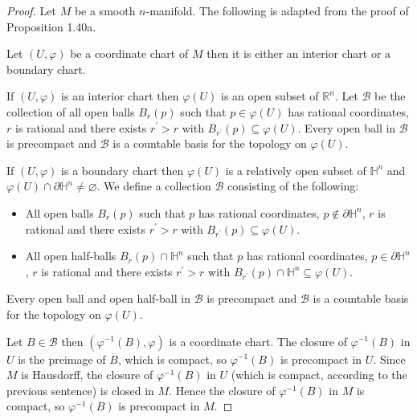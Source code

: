 \begin{proof}
    Let \( M \) be a smooth \(n\)-manifold. The following is adapted from the proof of Proposition 1.40a.

    Let \( (U, \varphi) \) be a coordinate chart of \( M \) then it is either an interior chart or a boundary chart.

    If \( (U, \varphi) \) is an interior chart then \( \varphi(U) \) is an open subset of \( \mathbb{R}^{n} \). Let \( \mathcal{B} \) be the collection of all open balls \( B_{r}(p) \) such that \( p \in \varphi(U) \) has rational coordinates, \( r \) is rational and there exists \( r^{\prime} > r \) with \( B_{r^{\prime}}(p) \subseteq \varphi(U) \). Every open ball in \( \mathcal{B} \) is precompact and \( \mathcal{B} \) is a countable basis for the topology on \( \varphi(U) \).

    If \( (U, \varphi) \) is a boundary chart then \( \varphi(U) \) is a relatively open subset of \( \mathbb{H}^{n} \) and \( \varphi(U) \cap \partial \mathbb{H}^{n} \ne \varnothing \). We define a collection \( \mathcal{B} \) consisting of the following:
    \begin{itemize}[itemsep=0pt]
        \item All open balls \( B_{r}(p) \) such that \( p \) has rational coordinates, \( p \notin \partial \mathbb{H}^{n} \), \( r \) is rational and there exists \( r^{\prime} > r \) with \( B_{r^{\prime}}(p) \subseteq \varphi(U) \).
        \item All open half-balls \( B_{r}(p) \cap \mathbb{H}^{n} \) such that  \( p \) has rational coordinates, \( p \in \partial \mathbb{H}^{n} \), \( r \) is rational and there exists \( r^{\prime} > r \) with \( B_{r^{\prime}}(p) \cap \mathbb{H}^{n} \subseteq \varphi(U) \).
    \end{itemize}

    Every open ball and open half-ball in \( \mathcal{B} \) is precompact and \( \mathcal{B} \) is a countable basis for the topology on \( \varphi(U) \).

    Let \( B \in \mathcal{B} \) then \( (\varphi^{-1}(B), \varphi) \) is a coordinate chart. The closure of \( \varphi^{-1}(B) \) in \( U \) is the preimage of \( \overline{B} \), which is compact, so \( \varphi^{-1}(B) \) is precompact in \( U \). Since \( M \) is Hausdorff, the closure of \( \varphi^{-1}(B) \) in \( U \) (which is compact, according to the previous sentence) is closed in \( M \). Hence the closure of \( \varphi^{-1}(B) \) in \( M \) is compact, so \( \varphi^{-1}(B) \) is precompact in \( M \).


\end{proof}
